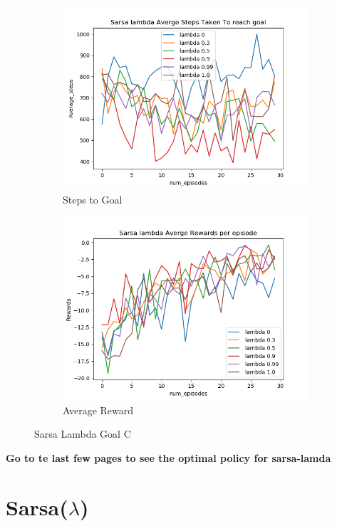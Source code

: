 \documentclass[12pt, letterpaper, twoside]{report}
\begin{document}
\begin{figure}[h!]
  \centering
  \begin{subfigure}[b]{0.6\linewidth}
    \includegraphics[width=\linewidth]{Sarasa_labda_goal_C_steps.png}
    \caption{Steps to Goal}
  \end{subfigure}
  \begin{subfigure}[b]{0.6\linewidth}
    \includegraphics[width=\linewidth]{Sarasa_labda_goal_C_returns.png}
    \caption{Average Reward}
  \end{subfigure}
  \caption{Sarsa Lambda Goal C}
  \label{fig:Softamx}
\end{figure}
\textbf{Go to te last few pages to see the optimal policy for sarsa-lamda}
\section*{Sarsa($\lambda$)}
\end{document}
